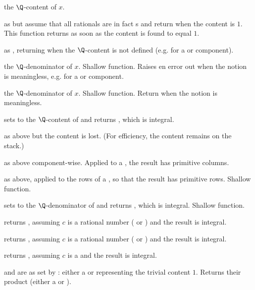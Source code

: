 the $\Q$-content of $x$.

 as  but assume that all rationals
are in fact s and return  when the content is $1$. This
function returns as soon as the content is found to equal $1$.

 as , returning
 when the $\Q$-content is not defined (e.g. for a 
or  component).

 the $\Q$-denominator of $x$. Shallow function.
Raises en  error out when the notion is meaningless, e.g. for
a  or  component.

 the $\Q$-denominator of $x$. Shallow function.
Return  when the notion is meaningless.

 sets  to the $\Q$-content
of  and returns , which is integral.

 as above but the content is lost. (For
efficiency, the content remains on the stack.)

 as above component-wise. Applied to a
, the result has primitive columns.

 as above, applied to the rows of a
, so that the result has primitive rows. Shallow function.

 sets  to the
$\Q$-denominator of  and returns , which is integral.
Shallow function.

 returns , assuming $c$
is a rational number ( or ) and the result is integral.

 returns , assuming $c$
is a rational number ( or ) and the result is integral.

 returns , assuming $c$
is a  and the result is integral.

   and  are
as set by : either a  or 
representing the trivial content $1$. Returns their product (either a
 or ).

